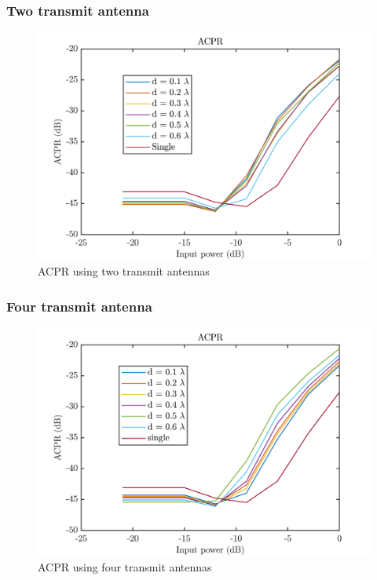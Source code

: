 \subsubsection{Two transmit antenna}

\begin{figure}[H]
\centering 
\includegraphics[scale = 1]{figures/measurement/two_antenna/ACPR.png}
\caption{ACPR using two transmit antennas}
\label{fig:acpr_meas1}
\end{figure} 

\subsubsection{Four transmit antenna}

\begin{figure}[H]
\centering 
\includegraphics[scale = 1]{figures/measurement/four_antenna/ACPR.png}
\caption{ACPR using four transmit antennas}
\label{fig:acpr_meas2}
\end{figure} 

